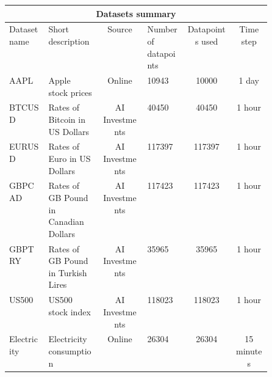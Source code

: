 \begin{center}
	\begin{tabular}{||p{0.15\linewidth} ||p{0.2\linewidth} | c | p{0.15\linewidth} | c | c ||}
		\hline
		\multicolumn{6}{|c|}{Datasets summary}                                                                                                         \\
		\hline
		Dataset name & Short description                      & Source                           & Number of datapoints & Datapoints used & Time step  \\ [0.5ex]
		\hline\hline
		AAPL         & Apple stock prices                     & Online \cite{apple_source}       & 10943                & 10000           & 1 day      \\
		\hline
		BTCUSD       & Rates of Bitcoin in US Dollars         & AI Investments                   & 40450                & 40450           & 1 hour     \\
		\hline
		EURUSD       & Rates of Euro in US Dollars            & AI Investments                   & 117397               & 117397          & 1 hour     \\
		\hline
		GBPCAD       & Rates  of GB Pound in Canadian Dollars & AI Investments                   & 117423               & 117423          & 1 hour     \\
		\hline
		GBPTRY       & Rates of GB Pound in Turkish Lires     & AI Investments                   & 35965                & 35965           & 1 hour     \\
		\hline
		US500        & US500 stock index                      & AI Investments                   & 118023               & 118023          & 1 hour     \\
		\hline
		Electricity  & Electricity consumption                & Online \cite{electricity_source} & 26304                & 26304           & 15 minutes \\[1ex]
		\hline
	\end{tabular}
\end{center}

